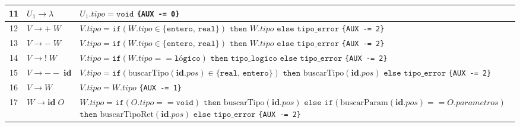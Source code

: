 \documentclass{article}
\begin{document}
\begin{longtable}{|c|>{\raggedright\arraybackslash}p{5.5cm}|>{\raggedright\arraybackslash}p{10cm}|}
11 & $U_1 \to \lambda$ & 
$U_1.tipo = \texttt{void}$ \newline
\texttt{\{AUX -= 0\}} \\ \hline

12 & $V \to + \; W$ & 
$V.tipo = \texttt{if}(W.tipo \in \{\texttt{entero, real}\}) \texttt{ then } W.tipo$ \newline
\hspace*{0.5cm} $\texttt{else tipo\_error}$ \newline
\texttt{\{AUX -= 2\}} \\ \hline

13 & $V \to - \; W$ & 
$V.tipo = \texttt{if}(W.tipo \in \{\texttt{entero, real}\}) \texttt{ then } W.tipo$ \newline
\hspace*{0.5cm} $\texttt{else tipo\_error}$ \newline
\texttt{\{AUX -= 2\}} \\ \hline

14 & $V \to ! \; W$ & 
$V.tipo = \texttt{if}(W.tipo == \texttt{lógico}) \texttt{ then tipo\_logico}$ \newline
\hspace*{0.5cm} $\texttt{else tipo\_error}$ \newline
\texttt{\{AUX -= 2\}} \\ \hline

15 & $V \to -- \; \mathbf{id}$ & 
$V.tipo = \texttt{if}(\text{buscarTipo}(\mathbf{id}.pos) \in \{\texttt{real, entero}\})$ \newline
\hspace*{0.5cm} $\texttt{then } \text{buscarTipo}(\mathbf{id}.pos)$ \newline
\hspace*{0.5cm} $\texttt{else tipo\_error}$ \newline
\texttt{\{AUX -= 2\}} \\ \hline

16 & $V \to W$ & 
$V.tipo = W.tipo$ \newline
\texttt{\{AUX -= 1\}} \\ \hline

17 & $W \to \mathbf{id} \; O$ & 
$W.tipo = \texttt{if}(O.tipo == \texttt{void}) \texttt{ then } \text{buscarTipo}(\mathbf{id}.pos)$ \newline
\hspace*{0.5cm} $\texttt{else if}(\text{buscarParam}(\mathbf{id}.pos) == O.parametros)$ \newline
\hspace*{1cm} $\texttt{then } \text{buscarTipoRet}(\mathbf{id}.pos)$ \newline
\hspace*{1cm} $\texttt{else tipo\_error}$ \newline
\texttt{\{AUX -= 2\}} \\ \hline


\end{longtable}
\end{document}
